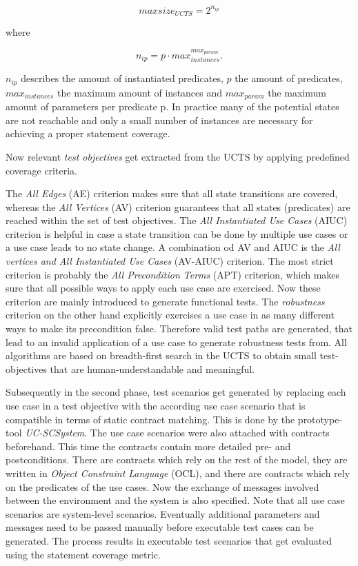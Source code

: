 \begin{equation}
	maxsize_{UCTS} = 2^{n_{ip}}
\end{equation}

where

\begin{equation}
	n_{ip} = p \cdot max_{instances}^{max_{param}}.
\end{equation}

$n_{ip}$ describes the amount of instantiated predicates, $p$ the amount of predicates, $max_{instances}$ the maximum amount of instances and $max_{param}$ the maximum amount of parameters per predicate p. In practice many of the potential states are not reachable and only a small number of instances are necessary for achieving a proper statement coverage. 

Now relevant \textit{test objectives} get extracted from the UCTS by applying predefined coverage criteria. 

The \textit{All Edges} (AE) criterion makes sure that all state transitions are covered, whereas the \textit{All Vertices} (AV) criterion guarantees that all states (predicates) are reached within the set of test objectives.  The \textit{All Instantiated Use Cases} (AIUC) criterion is helpful in case a state transition can be done by multiple use cases or a use case leads to no state change. A combination od AV and AIUC is the \textit{All vertices and All Instantiated Use Cases} (AV-AIUC) criterion. The most strict criterion is probably the \textit{All Precondition Terms} (APT) criterion, which makes sure that all possible ways to apply each use case are exercised. Now these criterion are mainly introduced to generate functional tests. The \textit{robustness} criterion on the other hand explicitly exercises a use case in as many different ways to make its precondition false. Therefore valid test paths are generated, that lead to an invalid application of a use case to generate robustness tests from. All algorithms are based on breadth-first search in the UCTS to obtain small test-objectives that are human-understandable and meaningful. 

Subsequently in the second phase, test scenarios get generated by replacing each use case in a test objective with the according use case scenario that is compatible in terms of static contract matching. This is done by the prototype-tool \textit{UC-SCSystem}. The use case scenarios were also attached with contracts beforehand. This time the contracts contain more detailed pre- and postconditions. There are contracts which rely on the rest of the model, they are written in \textit{Object Constraint Language} (OCL), and there are contracts which rely on the predicates of the use cases. Now the exchange of messages involved between the environment and the system is also specified. Note that all use case scenarios are system-level scenarios. Eventually additional parameters and messages need to be passed manually before executable test cases can be generated. The process results in executable test scenarios that get evaluated using the statement coverage metric.

